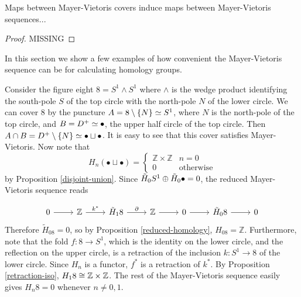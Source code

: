 \begin{prop}
Maps between Mayer-Vietoris covers induce maps between Mayer-Vietoris sequences...
\end{prop}
\begin{proof}
MISSING
\end{proof}
In this section we show a few examples of how convenient the Mayer-Vietoris sequence can be for calculating homology groups.

\begin{example}
Consider the figure eight $8=S^1\wedge S^1$ where $\wedge$ is the wedge product identifying the south-pole $S$ of the top circle with the north-pole $N$ of the lower circle. We can cover $8$ by the puncture $A=8\setminus \{N\}\simeq S^1$, where $N$ is the north-pole of the top circle, and $B=D^+\simeq \bullet$, the upper half circle of the top circle. Then $A\cap B= D^+\setminus\{N\}\simeq \bullet \sqcup \bullet$. It is easy to see that this cover satisfies Mayer-Vietoris. Now note that $$H_n(\bullet \sqcup \bullet)=\begin{cases}\mathbb{Z}\times\mathbb{Z} & n=0\\ 0 & \text{otherwise}\end{cases}$$ by Proposition \ref{disjoint-union}. Since $\tilde{H}_0S^1\oplus \tilde{H}_0\bullet=0$, the reduced Mayer-Vietoris sequence reads 

\[\begin{tikzcd}
0 \arrow[r] & \mathbb{Z} \arrow[r, "k^*"] & \tilde{H}_18 \arrow[r, "\partial"] & \mathbb{Z} \arrow[r] & 0 \arrow[r] & \tilde{H}_08 \arrow[r] & 0
\end{tikzcd}\]
Therefore $\tilde{H}_08=0$, so by Proposition \ref{reduced-homology}, $H_08=\mathbb{Z}$. Furthermore, note that the fold $f:8\rightarrow S^1$, which is the identity on the lower circle, and the reflection on the upper circle, is a retraction of the inclusion $k:S^1\rightarrow 8$ of the lower circle. Since $H_n$ is a functor, $f^*$ is a retraction of $k^*$. By Proposition \ref{retraction-iso}, $H_18\cong \mathbb{Z}\times\mathbb{Z}$. The rest of the Mayer-Vietoris sequence easily gives $H_n8=0$ whenever $n\neq 0,1$.


\end{example}
